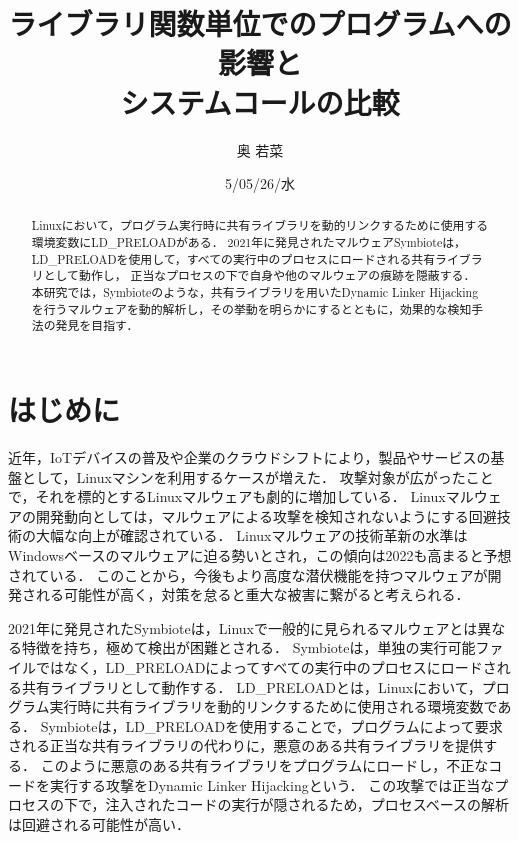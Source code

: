\documentclass[submit,techreq,noauthor]{eco}	%
\begin{document}
\date   {5/05/26/水}				%
\title  {ライブラリ関数単位でのプログラムへの影響と\\システムコールの比較}	%
\author {奥 若菜}				%


\begin{abstract}
	Linuxにおいて，プログラム実行時に共有ライブラリを動的リンクするために使用する環境変数にLD\_PRELOADがある．
  2021年に発見されたマルウェアSymbioteは，LD\_PRELOADを使用して，すべての実行中のプロセスにロードされる共有ライブラリとして動作し，
  正当なプロセスの下で自身や他のマルウェアの痕跡を隠蔽する．
  本研究では，Symbioteのような，共有ライブラリを用いたDynamic Linker Hijackingを行うマルウェアを動的解析し，その挙動を明らかにするとともに，効果的な検知手法の発見を目指す．
\end{abstract}
\maketitle


\section{はじめに}
近年，IoTデバイスの普及や企業のクラウドシフトにより，製品やサービスの基盤として，Linuxマシンを利用するケースが増えた．
攻撃対象が広がったことで，それを標的とするLinuxマルウェアも劇的に増加している\cite{TREND-MICRO}．
Linuxマルウェアの開発動向としては，マルウェアによる攻撃を検知されないようにする回避技術の大幅な向上が確認されている\cite{IBM}．
Linuxマルウェアの技術革新の水準はWindowsベースのマルウェアに迫る勢いとされ，この傾向は2022も高まると予想されている．
このことから，今後もより高度な潜伏機能を持つマルウェアが開発される可能性が高く，対策を怠ると重大な被害に繋がると考えられる．


2021年に発見されたSymbioteは，Linuxで一般的に見られるマルウェアとは異なる特徴を持ち，極めて検出が困難とされる\cite{Symbiote}．
Symbioteは，単独の実行可能ファイルではなく，LD\_PRELOADによってすべての実行中のプロセスにロードされる共有ライブラリとして動作する．
LD\_PRELOADとは，Linuxにおいて，プログラム実行時に共有ライブラリを動的リンクするために使用される環境変数である．
Symbioteは，LD\_PRELOADを使用することで，プログラムによって要求される正当な共有ライブラリの代わりに，悪意のある共有ライブラリを提供する．
このように悪意のある共有ライブラリをプログラムにロードし，不正なコードを実行する攻撃をDynamic Linker Hijackingという\cite{MITRE-ATT&CK}．
この攻撃では正当なプロセスの下で，注入されたコードの実行が隠されるため，プロセスベースの解析は回避される可能性が高い．
\end{document}
